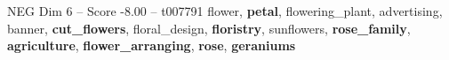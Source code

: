 \begin{textsample}{NEG Dim 6 – Score -8.00 – t007791}  \label{ex:f6_neg_022}
flower, \textbf{petal}, flowering\_plant, advertising, banner, \textbf{cut\_flowers}, floral\_design, \textbf{floristry}, sunflowers, \textbf{rose\_family}, \textbf{agriculture}, \textbf{flower\_arranging}, \textbf{rose}, \textbf{geraniums}

\end{textsample}
